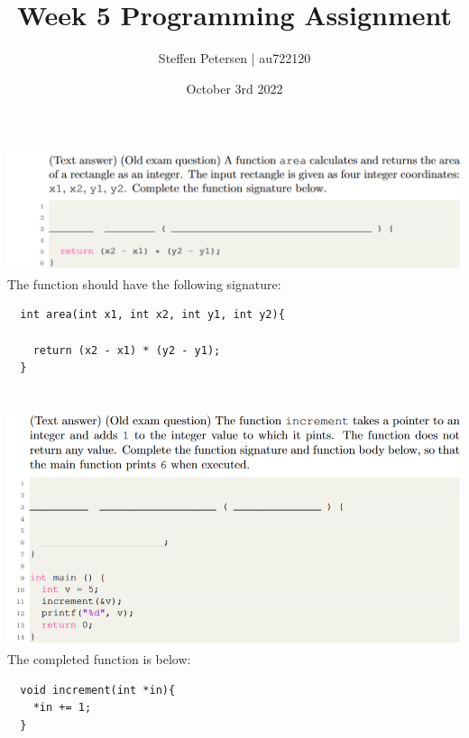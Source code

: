 \documentclass{article}
\title{Week 5 Programming Assignment}
\author{Steffen Petersen | au722120}
\date{October 3rd 2022}
\begin{document}


\maketitle
\section{}
\includegraphics[width=\linewidth, keepaspectratio=true]{task1}
\vspace{2pt}\\
The function should have the following signature:
\begin{lstlisting}
  int area(int x1, int x2, int y1, int y2){
    
    return (x2 - x1) * (y2 - y1);
  }

\end{lstlisting}

\pagebreak
\section{}
\includegraphics[width=\linewidth, keepaspectratio=true]{task2}
\vspace{2pt}\\
The completed function is below:
\begin{lstlisting}
  void increment(int *in){
    *in += 1;
  }

\end{lstlisting}
\end{document}

